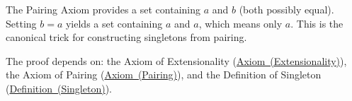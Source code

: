 \begin{remark*}
The Pairing Axiom provides a set containing $a$ and $b$ (both possibly equal).
Setting $b = a$ yields a set containing $a$ and $a$, which means only $a$. This
is the canonical trick for constructing singletons from pairing.
\end{remark*}

\begin{remark*}[Dependencies]
The proof depends on: the Axiom of Extensionality
(\hyperref[ax:zf-extensionality]{Axiom~(Extensionality)}), the Axiom of Pairing
(\hyperref[ax:zf-pairing]{Axiom~(Pairing)}), and the Definition of Singleton
(\hyperref[def:singleton]{Definition~(Singleton)}).
\end{remark*}
